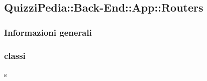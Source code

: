 \subsection{QuizziPedia::Back-End::App::Routers}
\subsubsection{Informazioni generali}
\subsubsection{classi}




s
